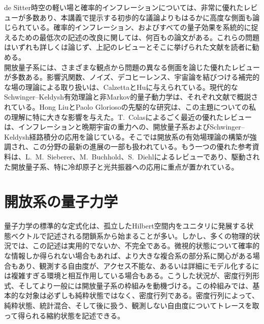 \documentclass[a4paper,11pt,oneside]{article}
\theoremstyle{definition}
\numberwithin{equation}{section}
\begin{document}
de Sitter時空の軽い場と確率的インフレーションについては、非常に優れたレビュー\cite{Woodard:2025cez,Cruces:2022imf,Vennin:2020kng}が多数あり、本講義で提示する初歩的な議論よりもはるかに高度な側面も論じられている。確率的インフレーション、およびすべての量子効果を系統的に捉えるための最低次の記述の改良に関しては、何百もの論文がある。これらの問題はいずれも詳しくは論じず、上記のレビューとそこに挙げられた文献を読者に勧める。\\



開放量子系には、さまざまな観点から問題の異なる側面を論じた優れたレビューが多数ある。影響汎関数、ノイズ、デコヒーレンス、宇宙論を結びつける補完的な場の理論による取り扱いは、CalzettaとHu\cite{Calzetta:2008iqa}に与えられている。現代的なSchwinger--Keldysh有効理論と非Markov的量子動力学は、それぞれ文献\cite{Liu:2018kfw,RivasHuelgaPlenio2014}で概説されている。Hong LiuとPaolo Gloriosoの先駆的な研究は、この主題についての私の理解に特に大きな影響を与えた。T.~Colasによるごく最近の優れたレビュー\cite{Colas:2025app}は、インフレーションと晩期宇宙の重力への、開放量子系およびSchwinger--Keldysh経路積分の応用を論じている。そこでは開放系の有効場理論の構築が強調され、この分野の最新の進展の一部も扱われている。もう一つの優れた参考資料は、L.~M.~Sieberer、M.~Buchhold、S.~Diehlによるレビュー\cite{2016RPPh...79i6001S}であり、駆動された開放量子系、特に冷却原子と光共振器への応用に重点が置かれている。








\section{開放系の量子力学}\label{sec:1}



量子力学の標準的な定式化は、孤立したHilbert空間内をユニタリに発展する状態ベクトルで記述される閉鎖系から始まることが多い。しかし、多くの物理的状況では、この記述は実用的でないか、不完全である。微視的状態について確率的な情報しか得られない場合もあれば、より大きな複合系の部分系に関心がある場合もあり、観測する自由度が、アクセス不能な、あるいは詳細にモデル化するには複雑すぎる環境と相互作用している場合もある。こうした状況が、密度行列形式、そしてより一般には開放量子系の枠組みを動機づける。この枠組みでは、基本的な対象は必ずしも純粋状態ではなく、密度行列である。密度行列によって、純粋状態、統計混合、そして後に扱う、観測しない自由度についてトレースを取って得られる縮約状態を記述できる。
\end{document}
